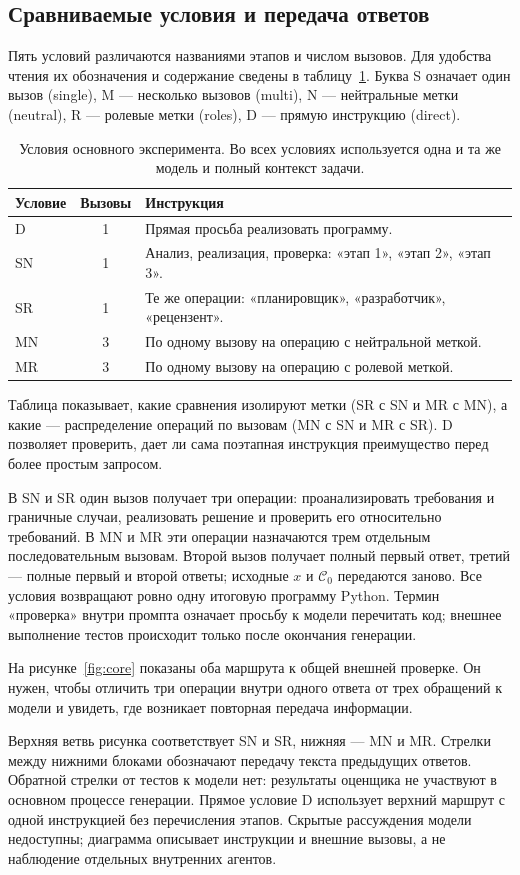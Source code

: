 \subsection{Сравниваемые условия и передача ответов}
Пять условий различаются названиями этапов и числом вызовов. Для удобства чтения их обозначения и содержание сведены в таблицу~\ref{tab:conditions}. Буква S означает один вызов (single), M --- несколько вызовов (multi), N --- нейтральные метки (neutral), R --- ролевые метки (roles), D --- прямую инструкцию (direct).
\begin{table}[H]
\caption{Условия основного эксперимента. Во всех условиях используется одна и та же модель и полный контекст задачи.}
\label{tab:conditions}
\centering\small
\begin{tabularx}{\linewidth}{@{}lcX@{}}
\toprule
Условие & Вызовы & Инструкция\\
\midrule
D & 1 & Прямая просьба реализовать программу.\\
SN & 1 & Анализ, реализация, проверка: «этап 1», «этап 2», «этап 3».\\
SR & 1 & Те же операции: «планировщик», «разработчик», «рецензент».\\
MN & 3 & По одному вызову на операцию с нейтральной меткой.\\
MR & 3 & По одному вызову на операцию с ролевой меткой.\\
\bottomrule
\end{tabularx}
\end{table}
Таблица показывает, какие сравнения изолируют метки (SR с SN и MR с MN), а какие --- распределение операций по вызовам (MN с SN и MR с SR). D позволяет проверить, дает ли сама поэтапная инструкция преимущество перед более простым запросом.

В SN и SR один вызов получает три операции: проанализировать требования и граничные случаи, реализовать решение и проверить его относительно требований. В MN и MR эти операции назначаются трем отдельным последовательным вызовам. Второй вызов получает полный первый ответ, третий --- полные первый и второй ответы; исходные $x$ и $\mathcal{C}_0$ передаются заново. Все условия возвращают ровно одну итоговую программу Python. Термин «проверка» внутри промпта означает просьбу к модели перечитать код; внешнее выполнение тестов происходит только после окончания генерации.

На рисунке~\ref{fig:core} показаны оба маршрута к общей внешней проверке. Он нужен, чтобы отличить три операции внутри одного ответа от трех обращений к модели и увидеть, где возникает повторная передача информации.

Верхняя ветвь рисунка соответствует SN и SR, нижняя --- MN и MR. Стрелки между нижними блоками обозначают передачу текста предыдущих ответов. Обратной стрелки от тестов к модели нет: результаты оценщика не участвуют в основном процессе генерации. Прямое условие D использует верхний маршрут с одной инструкцией без перечисления этапов. Скрытые рассуждения модели недоступны; диаграмма описывает инструкции и внешние вызовы, а не наблюдение отдельных внутренних агентов.

